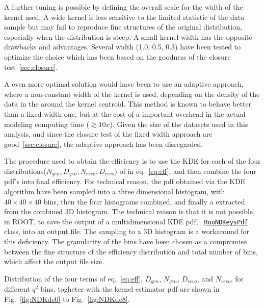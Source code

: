 A further tuning is possible by defining the overall scale for the width of the
kernel used. A wide kernel is less sensitive to the limited statistic of the
data sample but may fail to reproduce fine structures of the original
distribution, especially when the distribution is steep. A small kernel width
has the opposite drawbacks and advantages. Several width (1.0, 0.5, 0.3) have
been tested to optimize the choice which has been based on the
goodness of the closure test~\ref{sec:closure}.

A even more optimal solution would have been to use an adaptive approach, where
a non-constant width of the kernel is used, depending on the density of the
data in the around the kernel centroid. This method is known to behave better
than a fixed width one, but at the cost of a important overhead in the actual
modeling computing time ($\gtrsim10x$).
Given the size of the datasets used in this analysis, and since the closure
test of the fixed width approach are good~\ref{sec:closure}, the adaptive
approach has been disregarded.

The procedure used to obtain the efficiency \pdf is to use the KDE for
each of the four distributions($N_{gen}, D_{gen}, N_{reco}, D_{reco}$)
of in eq.~\ref{eq:eff}, and then combine the four pdf's into final
efficiency.  For technical reason, the pdf obtained via the KDE
algorithm have been sampled into a three dimensional histogram, with
$40\times40\times40$ bins, then the four histograms combined, and
finally a \pdf extracted from the combined 3D histogram. The technical
reason is that it is not possible, in ROOT, to save the output of a
multidimensional KDE pdf, {\tt
  \href{https://root.cern.ch/root/html/RooNDKeysPdf.html}{RooNDKeysPdf}}
class, into an output file.  The sampling to a 3D histogram is a
workaround for this deficiency. The granularity of the bins have been
chosen as a compromise between the fine structure of the efficiency
distribution and total number of bins, which affect the output file
size.

Distribution of the four terms of eq.~\ref{eq:eff}, $D_{gen}$,
$N_{gen}$, $D_{reco}$, and $N_{reco}$, for different $q^2$ bins,
togheter with the kernel estimator pdf are shown in
Fig.~\ref{fig:NDKde0} to Fig.~\ref{fig:NDKde8}.

